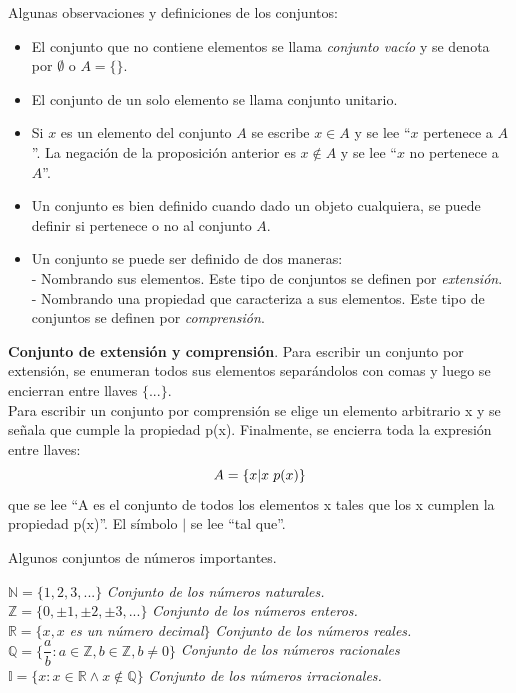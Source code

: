  Algunas observaciones y definiciones de los conjuntos:
\begin{itemize}

	\item El conjunto que no contiene elementos se llama \textit{conjunto vacío} y se denota por $\emptyset$ o $A=\{\}$.
	\item El conjunto de un solo elemento se llama conjunto unitario.
	\item Si $x$ es un elemento del conjunto $A$ se escribe $x\in A$ y se lee ``$x$ pertenece a $A$''. La negación de la proposición anterior es $x\notin A$ y se lee ``$x$ no pertenece a $A$''.
	\item Un conjunto es bien definido cuando dado un objeto cualquiera, se puede definir si pertenece o no al conjunto $A$.
	\item Un conjunto se puede ser definido de dos maneras:\\
		\subitem - Nombrando sus elementos. Este tipo de conjuntos se definen por \textit{extensión}.\\
		\subitem - Nombrando una propiedad que caracteriza a sus elementos. Este tipo de conjuntos se definen por \textit{comprensión}.
\end{itemize}

\begin{mydef}
\textbf{Conjunto de extensión y comprensión}. Para escribir un conjunto por extensión, se enumeran todos sus elementos separándolos con comas y luego se encierran entre llaves $\{...\}$.\\
Para escribir un conjunto por comprensión se elige un elemento arbitrario x y se señala que cumple la propiedad p(x). Finalmente, se encierra toda la expresión entre llaves:\\
\begin{equation*}
A=\{x|x\hspace{3px}p(x)\}
\end{equation*}
que se lee ``A es el conjunto de todos los elementos x tales que los x cumplen la propiedad p(x)''. El símbolo $|$ se lee ``tal que''.
\end{mydef}

\begin{myexample}\label{ejemplosNR}
Algunos conjuntos de números importantes.
\end{myexample}
\noindent $\mathbb{N}=\{1,2,3,...\}$ \textit{Conjunto de los números naturales.}\\
$\mathbb{Z}=\{0,\pm 1,\pm 2,\pm 3,...\}$ \textit{Conjunto de los números enteros.}\\
$\mathbb{R}=\{x,x$ \textit{es un número decimal}$\}$ \textit{Conjunto de los números reales.}\\
$\mathbb{Q}=\{\dfrac{a}{b}:a\in\mathbb{Z},b\in\mathbb{Z},b\neq 0\}$ \textit{Conjunto de los números racionales}\\
$\mathbb{I}=\{x:x\in\mathbb{R}\wedge x\notin\mathbb{Q}\}$ \textit{Conjunto de los números irracionales.}

